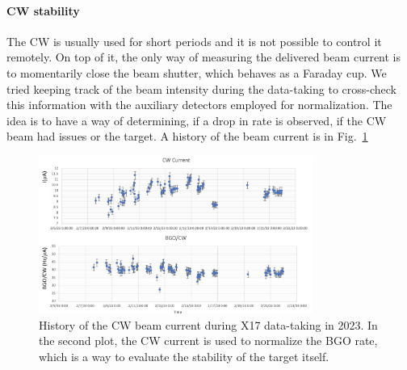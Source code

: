 \begin{refsection}
        \paragraph{CW stability} The CW is usually used for short periods and it is not possible to control it remotely.
        On top of it, the only way of measuring the delivered beam current is to momentarily close the beam shutter, which behaves as a Faraday cup.
        We tried keeping track of the beam intensity during the data-taking to cross-check this information with the auxiliary detectors employed for normalization.
        The idea is to have a way of determining, if a drop in rate is observed, if the CW beam had issues or the target.
        A history of the beam current is in Fig.~\ref{fig:X17:CW:current}
        \begin{figure}
            \centering
            \includegraphics[width = 0.8\textwidth]{Figures/X17/X17_Feb2023/Stability.pdf}
            \caption[X17: CW temporal stability]{History of the CW beam current during X17 data-taking in 2023. In the second plot, the CW current is used to normalize the BGO rate, which is a way to evaluate the stability of the target itself.}
            \label{fig:X17:CW:current}
        \end{figure}


\end{refsection}

